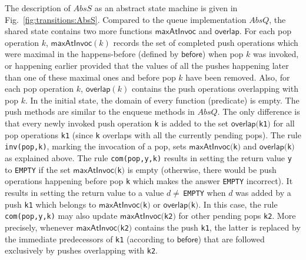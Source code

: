 The description of $AbsS$ as an abstract state machine is given in Fig.~\ref{fig:transitions:AbsS}. Compared to the queue implementation $AbsQ$, the shared state contains two more functions $\mathsf{maxAtInvoc}$ and $\mathsf{overlap}$. For each pop operation $k$, $\mathsf{maxAtInvoc}(k)$ records the set of completed push operations which were maximal in the happens-before (defined by $\mathsf{before}$) when pop $k$ was invoked, or happening earlier provided that the values of all the pushes happening later than one of these maximal ones and before pop $k$ have been removed. Also, for each pop operation $k$, $\mathsf{overlap}(k)$ contains the push operations overlapping with pop $k$.
In the initial state, the domain of every function (predicate) is empty. The push methods are similar to the enqueue methods in $AbsQ$. The only difference is that every newly invoked push operation {\tt k} is added to the set $\mathsf{overlap}(${\tt k1}$)$ for all pop operations {\tt k1} (since {\tt k} overlaps with all the currently pending pops). The rule {\tt inv(pop,k)}, marking the invocation of a pop, sets $\mathsf{maxAtInvoc}(${\tt k}$)$ and $\mathsf{overlap}(${\tt k}$)$ as explained above. The rule {\tt com(pop,y,k)} results in setting the return value {\tt y} to {\tt EMPTY} if the set $\mathsf{maxAtInvoc}(${\tt k}$)$ is empty (otherwise, there would be push operations happening before pop {\tt k} which makes the answer {\tt EMPTY} incorrect). It results in setting the return value to a value $d\neq\,${\tt EMPTY} when $d$ was added by a push {\tt k1} which belongs to $\mathsf{maxAtInvoc}(${\tt k}$)$ or $\mathsf{overlap}(${\tt k}$)$. In this case, the rule {\tt com(pop,y,k)} may also update $\mathsf{maxAtInvoc}(${\tt k2}$)$ for other pending pops {\tt k2}. More precisely, whenever $\mathsf{maxAtInvoc}(${\tt k2}$)$ contains the push {\tt k1}, the latter is replaced by the immediate predecessors of {\tt k1} (according to $\mathsf{before}$) that are followed exclusively by pushes overlapping with {\tt k2}.
